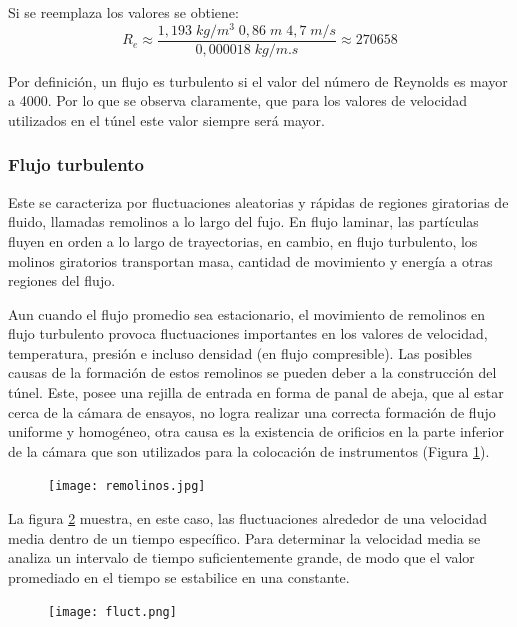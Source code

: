 Si se reemplaza los valores se obtiene:
\begin{equation} 
	R_e\approx \frac{1,193\;kg/m^{3}\;0,86\;m\;4,7\;m/s}{0,000018\;kg/m.s}\approx 270658
	\label{reyn2}
\end{equation}	

Por definición, un flujo es turbulento si el valor del número de Reynolds es mayor a 4000. Por lo que se observa claramente, que para los valores de velocidad utilizados en el túnel este valor siempre será mayor.

\subsubsection{Flujo turbulento}
\begin{tcolorbox}[colback=blue!5!white,colframe=blue!75!black,title=Flujo turbulento]
	Este se caracteriza por fluctuaciones aleatorias y rápidas de regiones giratorias de fluido, llamadas remolinos a lo largo del fujo. En flujo laminar, las partículas fluyen en orden a lo largo de trayectorias, en cambio, en flujo turbulento, los molinos giratorios transportan masa, cantidad de movimiento y energía a otras regiones del flujo. \cite{yunus2006mecanica}
	
\end{tcolorbox}

Aun cuando el flujo promedio sea estacionario, el movimiento de remolinos en flujo turbulento provoca fluctuaciones importantes en los valores de velocidad, temperatura, presión e incluso densidad (en flujo compresible). Las posibles causas de la formación de estos remolinos se pueden deber a la construcción del túnel. Este, posee una rejilla de entrada en forma de panal de abeja, que al estar cerca de la cámara de ensayos, no logra realizar una correcta formación de flujo uniforme y homogéneo, otra causa es la existencia de orificios en la parte inferior de la cámara que son utilizados para la colocación de instrumentos (Figura \ref{fig:remolinos}).


\begin{figure}[h!]
	\centering
	\texttt{[image: remolinos.jpg]}
	\label{fig:remolinos}
\end{figure}


La figura \ref{fig:fluct} muestra, en este caso, las fluctuaciones alrededor de una velocidad media dentro de un tiempo específico. 
Para determinar la velocidad media se analiza un intervalo de tiempo suficientemente grande, de modo que el valor promediado en el tiempo se estabilice en una constante.
\begin{figure}[h!]
	\centering
	\texttt{[image: fluct.png]}
	\label{fig:fluct}
\end{figure}


